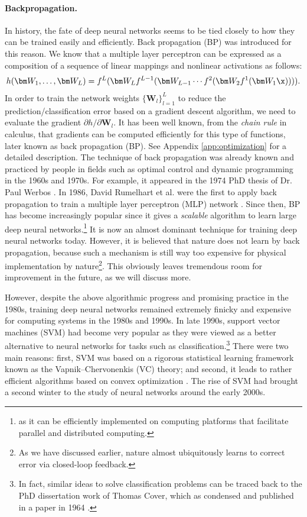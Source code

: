 \documentclass[../../book-main.tex]{subfiles}
\begin{document}
\paragraph{Backpropagation.}
In history, the fate of deep neural networks seems to be tied closely to how they can be trained easily and efficiently. Back propagation (BP) was introduced for this reason. We know that a multiple layer perceptron can be expressed as a  composition of a sequence of linear mappings and nonlinear activations as follows:
\begin{equation}
h(\bm W_1, \ldots, \bm W_L) = f^L(\bm W_Lf^{L-1}(\bm W_{L-1} \cdots f^2(\bm W_2f^1(\bm W_1\x)))).
\end{equation}
In order to train the network weights $\{\bm W_l\}_{l=1}^L$ to reduce the prediction/classification error based on a gradient descent algorithm, we need to evaluate the gradient ${\partial h}/{\partial \bm W_l}$. It has been well known, from the {\em chain rule} in calculus, that gradients can be computed efficiently for this type of functions, later known as back propagation (BP). See Appendix \ref{app:optimization} for a detailed description. The technique of back propagation was already known and practiced by people in fields such as optimal control and dynamic programming in the 1960s and 1970s. For example, it appeared in the 1974 PhD thesis of Dr. Paul Werbos \cite{Werbos-1974, Werbos1994TheRO}. In 1986, David Rumelhart et al. were the first to apply back propagation  to train a multiple layer perceptron (MLP) network \cite{Rumelhart1986}. Since then,  BP has become increasingly popular since it gives a {\em scalable} algorithm to learn large deep neural networks.\footnote{as it can be efficiently implemented on computing platforms that facilitate parallel and distributed computing.} It is now an almost dominant technique for training deep neural networks today. However, it is believed that nature does not learn by back propagation,  because such a mechanism is still way too expensive for physical implementation by nature\footnote{As we have discussed earlier, nature almost ubiquitously learns to correct error via closed-loop feedback.}. This obviously leaves tremendous room for improvement in the future, as we will discuss more.

However, despite the above algorithmic progress and promising practice in the 1980s, training deep neural networks remained extremely finicky and expensive for computing systems in the 1980s and 1990s. In late 1990s, support vector machines (SVM) \cite{SVM-1995} had become very popular as they were viewed as a better alternative to neural networks for tasks such as classification.\footnote{In fact, similar ideas to solve classification problems can be traced back to the PhD dissertation work of Thomas Cover, which as condensed and published in a paper in 1964  \cite{Cover-1964}.} There were two main reasons: first, SVM was based on a rigorous statistical learning framework known as the Vapnik--Chervonenkis (VC) theory; and second, it leads to rather efficient algorithms based on convex optimization \cite{BoydVa04}. The rise of SVM had brought a second winter to the study of neural networks around the early 2000s. 
\end{document}
